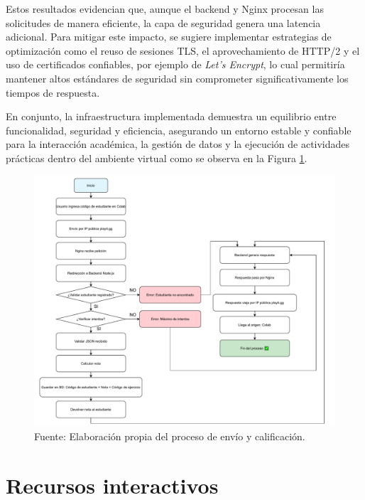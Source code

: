 \documentclass[letter,oneside,12pt,spanish]{report}
\begin{document}
Estos resultados evidencian que, aunque el backend y Nginx procesan las solicitudes de manera eficiente, la capa de seguridad genera una latencia adicional. Para mitigar este impacto, se sugiere implementar estrategias de optimización como el reuso de sesiones TLS, el aprovechamiento de HTTP/2 y el uso de certificados confiables, por ejemplo de \textit{Let’s Encrypt}, lo cual permitiría mantener altos estándares de seguridad sin comprometer significativamente los tiempos de respuesta.

En conjunto, la infraestructura implementada demuestra un equilibrio entre funcionalidad, seguridad y eficiencia, asegurando un entorno estable y confiable para la interacción académica, la gestión de datos y la ejecución de actividades prácticas dentro del ambiente virtual como se observa en la Figura \ref{fig:DF}.

\newpage

\begin{figure}[ht]
	\centering
	\includegraphics[width=1\textwidth]{Figs/Diagrama_Flujo.pdf}
	\label{fig:DF}
	\\Fuente: Elaboración propia del proceso de envío y calificación.
\end{figure}

\section{Recursos interactivos}
\end{document}
